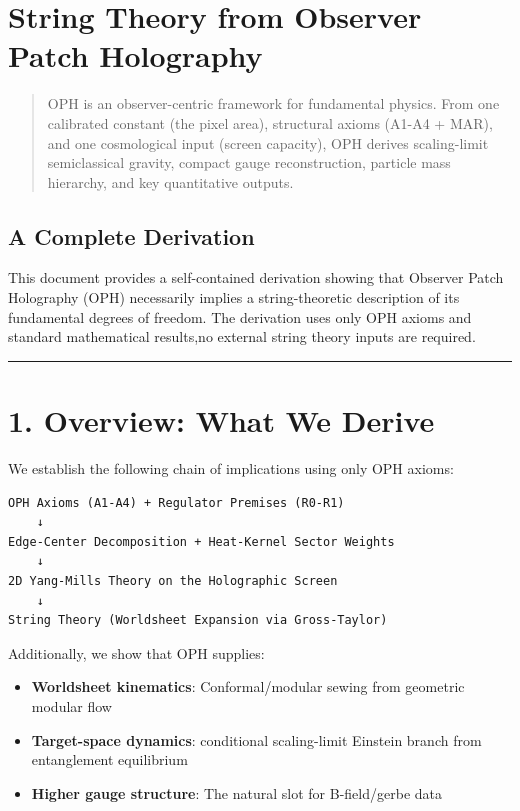 \section{String Theory from Observer Patch Holography}\label{string-theory-from-observer-patch-holography}

\begin{quote}
OPH is an observer-centric framework for fundamental physics. From one calibrated constant (the pixel area), structural axioms (A1-A4 + MAR), and one cosmological input (screen capacity), OPH derives scaling-limit semiclassical gravity, compact gauge reconstruction, particle mass hierarchy, and key quantitative outputs.
\end{quote}

\subsection{A Complete Derivation}\label{a-complete-derivation}

This document provides a self-contained derivation showing that Observer Patch Holography (OPH) necessarily implies a string-theoretic description of its fundamental degrees of freedom. The derivation uses only OPH axioms and standard mathematical results,no external string theory inputs are required.

\begin{center}\rule{0.5\linewidth}{0.5pt}\end{center}

\section{1. Overview: What We Derive}\label{1-overview-what-we-derive}

We establish the following chain of implications using only OPH axioms:

\begin{verbatim}
OPH Axioms (A1-A4) + Regulator Premises (R0-R1)
    ↓
Edge-Center Decomposition + Heat-Kernel Sector Weights
    ↓
2D Yang-Mills Theory on the Holographic Screen
    ↓
String Theory (Worldsheet Expansion via Gross-Taylor)
\end{verbatim}

Additionally, we show that OPH supplies:

\begin{itemize}
\tightlist
\item
  \textbf{Worldsheet kinematics}: Conformal/modular sewing from geometric modular flow
\item
  \textbf{Target-space dynamics}: conditional scaling-limit Einstein branch from entanglement equilibrium
\item
  \textbf{Higher gauge structure}: The natural slot for B-field/gerbe data
\end{itemize}

